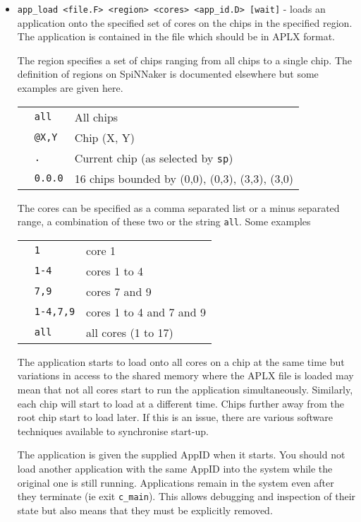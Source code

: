 \begin{itemize}

\item
\texttt{app\_load <file.F> <region> <cores> <app\_id.D> [wait]} -
loads an application onto the specified set of cores on the chips in
the specified region. The application is contained in the file which
should be in APLX format.

The region specifies a set of chips ranging from all chips to a single
chip. The definition of regions on SpiNNaker is documented elsewhere
but some examples are given here.

\begin{tabular}{p{0.5cm} p{2cm} p{12cm}}
& \texttt{all} & All chips \\
& \texttt{@X,Y} & Chip (X, Y) \\
& \texttt{.} & Current chip (as selected by \texttt{sp}) \\
& \texttt{0.0.0} & 16 chips bounded by (0,0), (0,3), (3,3), (3,0) \\
\end{tabular}

The cores can be specified as a comma separated list or a minus
separated range, a combination of these two or the
string \texttt{all}. Some examples

\begin{tabular}{p{0.5cm} p{2cm} p{12cm}}
& \texttt{1} & core 1 \\
& \texttt{1-4} & cores 1 to 4 \\
& \texttt{7,9} & cores 7 and 9 \\
& \texttt{1-4,7,9} & cores 1 to 4 and 7 and 9 \\
& \texttt{all} & all cores (1 to 17)\\
\end{tabular}

The application starts to load onto all cores on a chip at the same
time but variations in access to the shared memory where the APLX file
is loaded may mean that not all cores start to run the application
simultaneously. Similarly, each chip will start to load at a different
time. Chips further away from the root chip start to load later. If
this is an issue, there are various software techniques available to
synchronise start-up.

The application is given the supplied AppID when it starts. You should
not load another application with the same AppID into the system while
the original one is still running. Applications remain in the system
even after they terminate (ie exit \texttt{c\_main}). This allows
debugging and inspection of their state but also means that they must
be explicitly removed.


\end{itemize}

